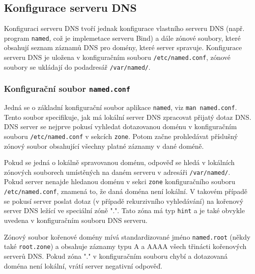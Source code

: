 \subsection{Konfigurace serveru DNS}
Konfiguraci serveru DNS tvoří jednak konfigurace vlastního serveru DNS (např. program {\tt named}, což je implemetace serveru Bind) a dále zónové soubory, které obsahují seznam záznamů DNS pro domény, které server spravuje. Konfigurace serveru DNS je uložena v konfiguračním souboru {\tt /etc/named.conf}, zónové soubory se ukládají do podadresář {\tt /var/named/}. 

\subsubsection{Konfigurační soubor {\tt named.conf}}
Jedná se o základní konfigurační soubor aplikace {\tt named}, viz {\tt man named.conf}. Tento soubor specifikuje, jak má lokální server DNS zpracovat přijatý dotaz DNS. DNS server se nejprve pokusí vyhledat dotazovanou doménu v konfiguračním souboru {\tt /etc/named.conf} v sekcích {\tt zone}. Potom začne prohledávat příslušný zónový soubor obsahující všechny platné záznamy v dané doméně. 

Pokud se jedná o lokálně spravovanou doménu, odpověď se hledá v lokálních zónových souborech umístěných na daném serveru v adresáři {\tt /var/named/}. Pokud server nenajde hledanou doménu v sekci {\tt zone} konfiguračního souboru {\tt /etc/named.conf}, znamená to, že daná doména není lokální. V takovém případě se pokusí server poslat dotaz (v případě rekurzivního vyhledávání) na kořenový server DNS ležící ve speciální zóně ".". Tato zóna má typ {\tt hint} a je také obvykle uvedena v konfiguračním souboru DNS serveru.

Zónový soubor kořenové domény mívá standardizované jméno {\tt named.root} (někdy také {\tt root.zone}) a obsahuje záznamy typu A a AAAA všech třinácti kořenových serverů DNS. Pokud zóna "." v konfiguračním souboru chybí a dotazovaná doména není lokální, vrátí server negativní odpověď.

